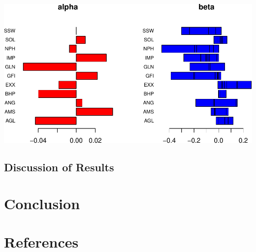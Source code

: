 \documentclass[11pt,preprint, authoryear]{elsarticle}
\let\origfigure\figure
\let\endorigfigure\endfigure
\renewenvironment{figure}[1][2] {
    \expandafter\origfigure\expandafter[H]
} {
    \endorigfigure
}
\numberwithin{equation}{section}
\numberwithin{figure}{section}
\numberwithin{table}{section}
\begin{document}
\begin{figure}[H]
\includegraphics{Factor-Model_files/figure-latex/unnamed-chunk-14-1} \caption{Factor Analysis: Resources \label{Fig12}}\label{fig:unnamed-chunk-14}
\end{figure}

\hypertarget{discussion-of-results}{%
\subsection{\texorpdfstring{Discussion of Results
\label{Disc}}{Discussion of Results }}\label{discussion-of-results}}

\hypertarget{conclusion}{%
\section{Conclusion}\label{conclusion}}

\newpage

\hypertarget{references}{%
\section{References}\label{references}}
\end{document}
